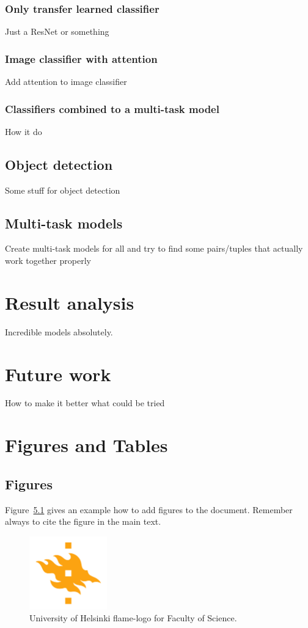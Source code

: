 \subsection{Only transfer learned classifier}
Just a ResNet or something
\subsection{Image classifier with attention}
Add attention to image classifier
\subsection{Classifiers combined to a multi-task model}
How it do
\section{Object detection}
Some stuff for object detection
\section{Multi-task models}
Create multi-task models for all and try to find some pairs/tuples that actually work together properly
\chapter{Result analysis}
Incredible models absolutely.

\chapter{Future work}
How to make it better what could be tried 

\chapter{Figures and Tables}

\section{Figures}
Figure~\ref{fig:logo} gives an example how to add figures to the document. Remember always to cite the figure in the main text.

\begin{figure}[h!] 
\centering 
\includegraphics[width=0.3\textwidth]{HY-logo-ml.png}
\caption{University of Helsinki flame-logo for Faculty of Science.\label{fig:logo}}
\end{figure}

